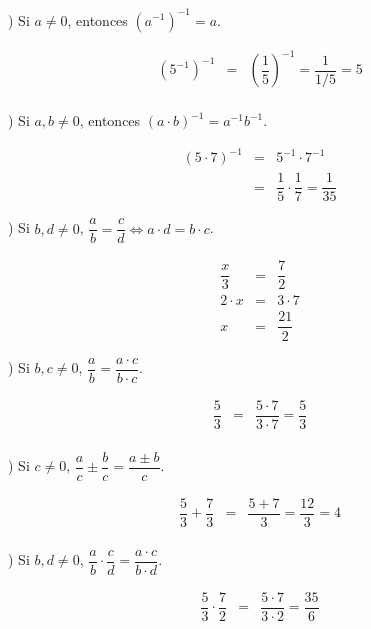 ) Si $a\neq 0$, entonces $(a^{-1})^{-1}=a$. \\
\begin{myexample}
\begin{eqnarray*}
(5^{-1})^{-1}&=&\left(\dfrac{1}{5}\right)^{-1}=\dfrac{1}{1/5}=5 \\
\end{eqnarray*}
\end{myexample}
\newpage
{}) Si $a,b\neq 0$, entonces $(a\cdot b)^{-1}=a^{-1}b^{-1}$. \\
\begin{myexample}
\begin{eqnarray*}
(5\cdot 7)^{-1}&=&5^{-1}\cdot 7^{-1} \\
&=& \dfrac{1}{5}\cdot \dfrac{1}{7}=\dfrac{1}{35}
\end{eqnarray*}
\end{myexample}
) Si $b,d\neq 0$, $\dfrac{a}{b}=\dfrac{c}{d}\Leftrightarrow a\cdot d =b\cdot c$. \\
\begin{myexample}
\begin{eqnarray*}
\dfrac{x}{3}&=&\dfrac{7}{2} \\
2\cdot x &=& 3\cdot 7\\
x&=&\dfrac{21}{2}
\end{eqnarray*}
\end{myexample}
) Si $b,c\neq 0$, $\dfrac{a}{b}=\dfrac{a\cdot c}{b\cdot c}$. \\
\begin{myexample}
\begin{eqnarray*}
\dfrac{5}{3}&=&\dfrac{5\cdot 7}{3\cdot 7}=\dfrac{5}{3} \\
\end{eqnarray*}
\end{myexample}
) Si $c\neq 0$, $\dfrac{a}{c}\pm\dfrac{b}{c}=\dfrac{a\pm b}{c}$. \\
\begin{myexample}
\begin{eqnarray*}
\dfrac{5}{3}+\dfrac{7}{3}&=&\dfrac{5+7}{3}=\dfrac{12}{3}=4 \\
\end{eqnarray*}
\end{myexample}
) Si $b,d \neq 0$, $\dfrac{a}{b}\cdot\dfrac{c}{d}=\dfrac{a\cdot c}{b\cdot d}$. \\
\begin{myexample}
\begin{eqnarray*}
\dfrac{5}{3}\cdot\dfrac{7}{2}&=&\dfrac{5\cdot 7}{3\cdot 2}=\dfrac{35}{6} \\
\end{eqnarray*}
\end{myexample}

